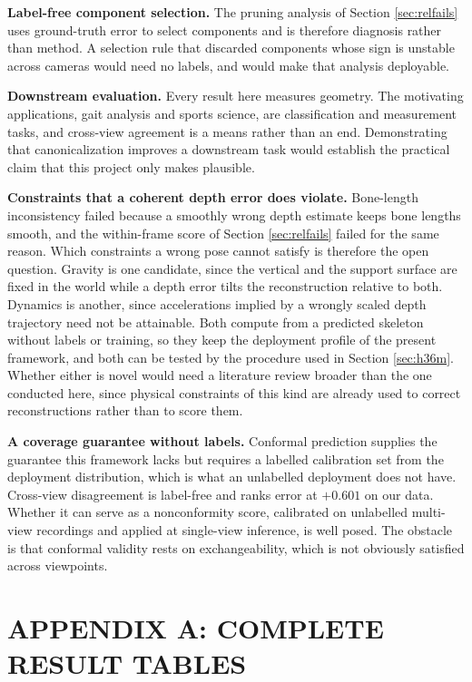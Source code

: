 \documentclass[12pt,a4paper]{report}
\begin{document}
\noindent \textbf{Label-free component selection.} The pruning analysis of Section \ref{sec:relfails} uses ground-truth error to select components and is therefore diagnosis rather than method. A selection rule that discarded components whose sign is unstable across cameras would need no labels, and would make that analysis deployable.

\noindent \textbf{Downstream evaluation.} Every result here measures geometry. The motivating applications, gait analysis and sports science, are classification and measurement tasks, and cross-view agreement is a means rather than an end. Demonstrating that canonicalization improves a downstream task would establish the practical claim that this project only makes plausible.

\noindent \textbf{Constraints that a coherent depth error does violate.} Bone-length inconsistency failed because a smoothly wrong depth estimate keeps bone lengths smooth, and the within-frame score of Section \ref{sec:relfails} failed for the same reason. Which constraints a wrong pose cannot satisfy is therefore the open question. Gravity is one candidate, since the vertical and the support surface are fixed in the world while a depth error tilts the reconstruction relative to both. Dynamics is another, since accelerations implied by a wrongly scaled depth trajectory need not be attainable. Both compute from a predicted skeleton without labels or training, so they keep the deployment profile of the present framework, and both can be tested by the procedure used in Section \ref{sec:h36m}. Whether either is novel would need a literature review broader than the one conducted here, since physical constraints of this kind are already used to correct reconstructions rather than to score them.

\noindent \textbf{A coverage guarantee without labels.} Conformal prediction supplies the guarantee this framework lacks but requires a labelled calibration set from the deployment distribution, which is what an unlabelled deployment does not have. Cross-view disagreement is label-free and ranks error at $+0.601$ on our data. Whether it can serve as a nonconformity score, calibrated on unlabelled multi-view recordings and applied at single-view inference, is well posed. The obstacle is that conformal validity rests on exchangeability, which is not obviously satisfied across viewpoints.

\newpage
\chapter*{APPENDIX A: COMPLETE RESULT TABLES}
\end{document}
